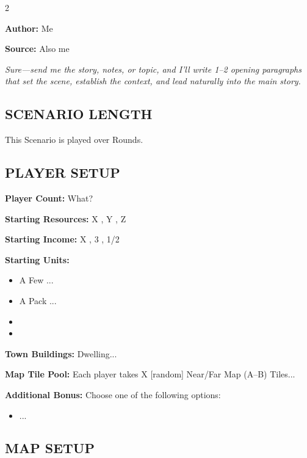 
\begin{multicols*}{2}

\textbf{Author:} Me

\textbf{Source:} Also me

\textit{Sure—send me the story, notes, or topic, and I’ll write 1–2 opening paragraphs that set the scene, establish the context, and lead naturally into the main story.}

\subsection*{\MakeUppercase{Scenario Length}}

This Scenario is played over Rounds.

\subsection*{\MakeUppercase{Player Setup}}

\textbf{Player Count:} What?

\textbf{Starting Resources:} X , Y , Z 

\textbf{Starting Income:} X , 3 , 1/2 

\textbf{Starting Units:}
\begin{itemize}
  \item A Few ...
  \item A Pack ...
  \item {}
  \item {}
\end{itemize}

\textbf{Town Buildings:}  Dwelling...

\textbf{Map Tile Pool:} Each player takes X [random] Near/Far Map (A--B) Tiles...

\textbf{Additional Bonus:} Choose one of the following options:

\begin{itemize}
    \item ...
\end{itemize}

\subsection*{\MakeUppercase{Map Setup}}


\end{multicols*}
